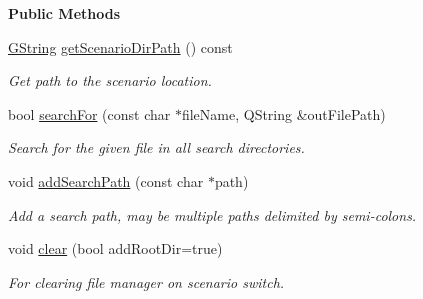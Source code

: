\begin{Indent}\textbf{ Public Methods}\par
\begin{DoxyCompactItemize}
\item 
\mbox{\label{classrev_1_1_file_manager_a490c81fd47e254ec496985fcc077176c}} 
\mbox{\hyperlink{classrev_1_1_g_string}{G\+String}} \mbox{\hyperlink{classrev_1_1_file_manager_a490c81fd47e254ec496985fcc077176c}{get\+Scenario\+Dir\+Path}} () const
\begin{DoxyCompactList}\small\item\em Get path to the scenario location. \end{DoxyCompactList}\item 
\mbox{\label{classrev_1_1_file_manager_ab80990c7c8bd85afa72573fca43be5bb}} 
bool \mbox{\hyperlink{classrev_1_1_file_manager_ab80990c7c8bd85afa72573fca43be5bb}{search\+For}} (const char $\ast$file\+Name, Q\+String \&out\+File\+Path)
\begin{DoxyCompactList}\small\item\em Search for the given file in all search directories. \end{DoxyCompactList}\item 
\mbox{\label{classrev_1_1_file_manager_ab4cff4e339651e1c40cb098c897f6fc6}} 
void \mbox{\hyperlink{classrev_1_1_file_manager_ab4cff4e339651e1c40cb098c897f6fc6}{add\+Search\+Path}} (const char $\ast$path)
\begin{DoxyCompactList}\small\item\em Add a search path, may be multiple paths delimited by semi-\/colons. \end{DoxyCompactList}\item 
\mbox{\label{classrev_1_1_file_manager_a4fdc564131597e45289c1c96b882f477}} 
void \mbox{\hyperlink{classrev_1_1_file_manager_a4fdc564131597e45289c1c96b882f477}{clear}} (bool add\+Root\+Dir=true)
\begin{DoxyCompactList}\small\item\em For clearing file manager on scenario switch. \end{DoxyCompactList}\end{DoxyCompactItemize}
\end{Indent}
